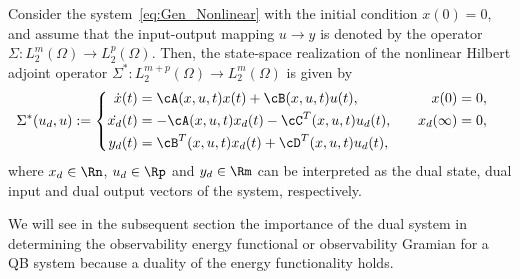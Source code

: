 \begin{lemma}\cite{Adjfujimoto2002}\label{lemma:adjointsys}
 Consider the system~\eqref{eq:Gen_Nonlinear} with the initial condition $x(0) =0$, and assume that the input-output mapping $u\rightarrow y$ is denoted by the operator $\Sigma : L_2^m(\Omega) \rightarrow L_2^p(\Omega)$. Then, the state-space realization of the nonlinear Hilbert adjoint operator $\Sigma^*:L_2^{m+p}(\Omega) \rightarrow L_2^m(\Omega)$ is given by
 \begin{equation}\label{eq:Gen_Nonlinear_Adj}
 \Sigma^*(u_d,u) := \begin{cases}
\begin{aligned}
   \dot{x}(t) &= \cA(x,u,t)x(t) + \cB(x,u,t)u(t), & \quad  x(0) &= 0,\\
   \dot{x_d}(t) &= -\cA(x,u,t)x_d(t) - \cC^T(x,u,t)u_d(t), & \quad  x_d(\infty) &= 0,\\
   y_d(t) &= \cB^T(x,u,t)x_d(t) + \cD^T(x,u,t)u_d(t),
  \end{aligned}
\end{cases}
\end{equation}
where $x_d \in \Rn$, $u_d \in\Rp$ and $y_d\in\Rm$ can be interpreted as the dual state, dual input and  dual output vectors of the system, respectively.
\end{lemma}
We will see in the subsequent section the importance of the dual system in determining the observability energy functional or observability Gramian for a  QB system because a duality of the energy functionality holds. 

